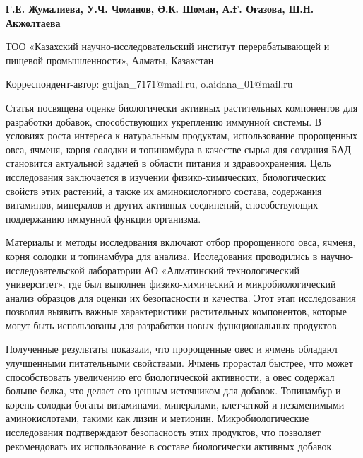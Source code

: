 
\begin{articleheader}

{\bfseries
Г.Е. Жумалиева\textsuperscript{\envelope },
У.Ч. Чоманов,
Ә.К. Шоман,
А.Ғ. Оғазова\textsuperscript{\envelope },
Ш.Н. Акжолтаева
}
\end{articleheader}

\begin{affiliation}
ТОО «Казахский научно-исследовательский институт перерабатывающей и
пищевой промышленности», Алматы, Казахстан
\vspace{0.5em}

\raggedright \textsuperscript{\envelope }Корреспондент-автор: guljan\_7171@mail.ru, o.aidana\_01@mail.ru
\end{affiliation}

Статья посвящена оценке биологически активных растительных компонентов
для разработки добавок, способствующих укреплению иммунной системы. В
условиях роста интереса к натуральным продуктам, использование
пророщенных овса, ячменя, корня солодки и топинамбура в качестве сырья
для создания БАД становится актуальной задачей в области питания и
здравоохранения. Цель исследования заключается в изучении
физико-химических, биологических свойств этих растений, а также их
аминокислотного состава, содержания витаминов, минералов и других
активных соединений, способствующих поддержанию иммунной функции
организма.

Материалы и методы исследования включают отбор пророщенного овса,
ячменя, корня солодки и топинамбура для анализа. Исследования
проводились в научно-исследовательской лаборатории АО «Алматинский
технологический университет», где был выполнен физико-химический и
микробиологический анализ образцов для оценки их безопасности и
качества. Этот этап исследования позволил выявить важные характеристики
растительных компонентов, которые могут быть использованы для разработки
новых функциональных продуктов.

Полученные результаты показали, что пророщенные овес и ячмень обладают
улучшенными питательными свойствами. Ячмень прорастал быстрее, что может
способствовать увеличению его биологической активности, а овес содержал
больше белка, что делает его ценным источником для добавок. Топинамбур и
корень солодки богаты витаминами, минералами, клетчаткой и незаменимыми
аминокислотами, такими как лизин и метионин. Микробиологические
исследования подтверждают безопасность этих продуктов, что позволяет
рекомендовать их использование в составе биологически активных добавок.


